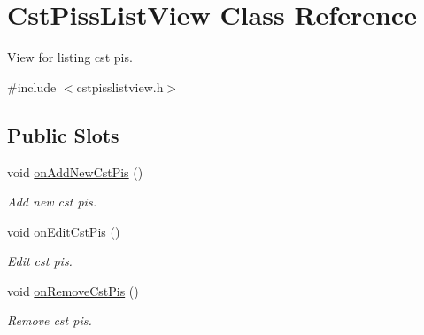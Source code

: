 \hypertarget{class_cst_piss_list_view}{\section{\-Cst\-Piss\-List\-View \-Class \-Reference}
\label{class_cst_piss_list_view}
}


\-View for listing cst pis.  




{\ttfamily \#include $<$cstpisslistview.\-h$>$}

\subsection*{\-Public \-Slots}
\begin{DoxyCompactItemize}
\item 
void \hyperlink{class_cst_piss_list_view_a7be4b4aaf3a45de01e0e2fbe2de6a974}{on\-Add\-New\-Cst\-Pis} ()
\begin{DoxyCompactList}\small\item\em \-Add new cst pis. \end{DoxyCompactList}\item 
void \hyperlink{class_cst_piss_list_view_a40f35ffb721695758c590cf8596141ba}{on\-Edit\-Cst\-Pis} ()
\begin{DoxyCompactList}\small\item\em \-Edit cst pis. \end{DoxyCompactList}\item 
void \hyperlink{class_cst_piss_list_view_a028d3d3883c67d104bfd5b78288a67b1}{on\-Remove\-Cst\-Pis} ()
\begin{DoxyCompactList}\small\item\em \-Remove cst pis. \end{DoxyCompactList}\end{DoxyCompactItemize}
